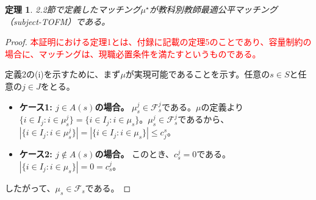 \documentclass[12pt, a4paper]{article}
\theoremstyle{definition}
\theoremstyle{remark}
\theoremstyle{plain}
\newtheorem{theorem}{定理}
\begin{document}
  
\begin{theorem}
2.2節で定義したマッチング$\mu^\star$が教科別教師最適公平マッチング（subject-TOFM）である。
\end{theorem}


\begin{proof}

    \textcolor{red}{本証明における定理1とは、付録に記載の定理5のことであり、容量制約の場合に、マッチングは、現職必置条件を満たすというものである。}

定義2の(i)を示すために、まず$\mu$が実現可能であることを示す。任意の$s \in S$と任意の$j \in J$をとる。
\begin{itemize}
    \item \textbf{ケース1: $j \in A(s)$の場合。} $\mu^j_s \in \mathcal{F}^j_s$である。$\mu$の定義より$\{i \in I_j : i \in \mu^j_s\} = \{ i \in I_j : i\in \mu_s \}$。$\mu^j_s \in \mathcal{F}^j_s$であるから、$|\{i \in I_j : i \in \mu^j_s\}| = |\{ i \in I_j : i\in \mu_s \}| \leq c_j^s$。
    \item \textbf{ケース2: $j \notin A(s)$の場合。} このとき、$c^j_s=0$である。$|\{i \in I_j : i \in \mu_s\}|= 0 = c^j_s$。
\end{itemize}
したがって、$\mu_s \in \mathcal{F}_s$である。


\end{proof}
\end{document}
